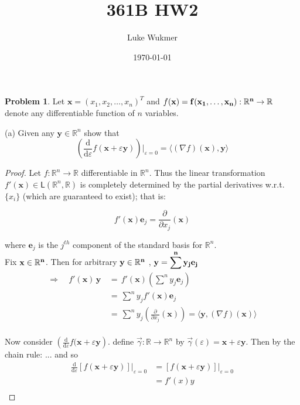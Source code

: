 \documentclass[10pt]{article}
\theoremstyle{plain}
\theoremstyle{definition}
\newtheorem{prob}{Problem}
\providecommand{\R}{\mathbb{R}}%
\numberwithin{equation}{section}
\renewcommand{\epsilon}{\varepsilon}
\begin{document}
\title{\Large{361B HW2}}
\author{Luke Wukmer}
\date{\today} %
\maketitle \normalsize \thispagestyle{empty} %

\begin{prob}
Let $\mathbf{x} = ( x_1, x_2, \dots , x_n )^T$ and $f(\bf{x}) = f(x_1, \dots, x_n) : \R^n \rightarrow \R$ denote any differentiable function of $n$ variables.

(a) Given any $\mathbf{y} \in \R^n$ show that
\[
\left(\frac{\mathrm{d}}{\mathrm{d}\epsilon} f(\mathbf{x} + \epsilon \mathbf{y}) \right)\Big|_{\epsilon=0}  =
\big\langle(\nabla f) (\mathbf{x}) ,  \mathbf{y} \big\rangle
\]

 
\end{prob}

\begin{proof}
  Let $f: \R^n \rightarrow \R $ differentiable in $\R^n$. Thus the linear transformation
  $f' ( \mathbf{x} ) \in \mathsf{L} ( \R^n , \R ) $ is completely determined by the partial derivatives w.r.t. $\{x_i\}$
  (which are guaranteed to exist); that is:
  
  \[
  f'(\mathbf{x})\mathbf{e}_j = \frac{\partial}{\partial x_j} (\mathbf{x})
  \]
  
  where $\mathbf{e}_j$ is the $j^{th}$ component of the standard basis for $\R^n$.\\
  
  Fix $\bf{x} \in \R^n$. Then for arbitrary $\bf{y} \in \R^n$ , \quad
  $\bf{y} = \displaystyle  \sum^{n} y_j \bf{e}_j $
  \[
  \begin{aligned}
  \Longrightarrow \quad f'(\mathbf{x}) \, \mathbf{y} \, &= \, f'(\mathbf{x})\left(\sum^{n} y_j \mathbf{e}_j\right)\\
                                                          &= \, \sum^{n} y_j f'(\mathbf{x}) \mathbf{e}_j\\
                                                          &= \, \sum^{n} y_j \left(\frac{\partial}{\partial x_j} (\mathbf{x})\right)
                                                          = \langle \mathbf{y} , (\nabla f) (\mathbf{x}) \rangle \\
  \end{aligned}
  \]
  
  Now consider $\displaystyle \left(\frac{\mathrm{d}}{\mathrm{d}\epsilon} f(\mathbf{x} + \epsilon \mathbf{y}\right)$.
  define $\vec{\gamma} : \R \rightarrow \R^n $ by $\vec{\gamma}(\epsilon) = \mathbf{x} + \epsilon \mathbf{y}.$ Then by the chain rule:
  ...
  and so
  \[
  \begin{aligned}
  \frac{\mathrm{d}}{\mathrm{d} \epsilon} \left[ f(\mathbf{x} + \epsilon \mathbf{y}) \right] \big|_{\epsilon=0}
  &= \left[ f(\mathbf{x} + \epsilon \mathbf{y}) \right] \big|_{\epsilon=0} \\
  &= f'(x) y \\
  \end{aligned}
  \]
\end{proof}
\end{document}
